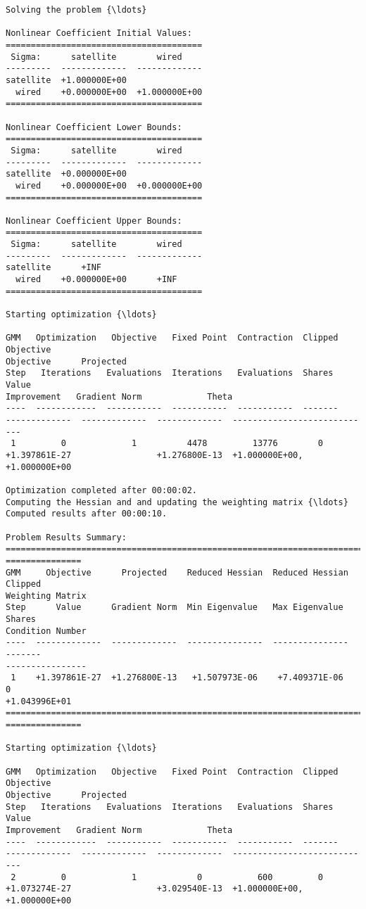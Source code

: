     \begin{Verbatim}[commandchars=\\\{\}]
Solving the problem {\ldots}

Nonlinear Coefficient Initial Values:
=======================================
 Sigma:      satellite        wired
---------  -------------  -------------
satellite  +1.000000E+00
  wired    +0.000000E+00  +1.000000E+00
=======================================

Nonlinear Coefficient Lower Bounds:
=======================================
 Sigma:      satellite        wired
---------  -------------  -------------
satellite  +0.000000E+00
  wired    +0.000000E+00  +0.000000E+00
=======================================

Nonlinear Coefficient Upper Bounds:
=======================================
 Sigma:      satellite        wired
---------  -------------  -------------
satellite      +INF
  wired    +0.000000E+00      +INF
=======================================

Starting optimization {\ldots}

GMM   Optimization   Objective   Fixed Point  Contraction  Clipped    Objective
Objective      Projected
Step   Iterations   Evaluations  Iterations   Evaluations  Shares       Value
Improvement   Gradient Norm             Theta
----  ------------  -----------  -----------  -----------  -------
-------------  -------------  -------------  ----------------------------
 1         0             1          4478         13776        0
+1.397861E-27                 +1.276800E-13  +1.000000E+00, +1.000000E+00

Optimization completed after 00:00:02.
Computing the Hessian and and updating the weighting matrix {\ldots}
Computed results after 00:00:10.

Problem Results Summary:
================================================================================
===============
GMM     Objective      Projected    Reduced Hessian  Reduced Hessian  Clipped
Weighting Matrix
Step      Value      Gradient Norm  Min Eigenvalue   Max Eigenvalue   Shares
Condition Number
----  -------------  -------------  ---------------  ---------------  -------
----------------
 1    +1.397861E-27  +1.276800E-13   +1.507973E-06    +7.409371E-06      0
+1.043996E+01
================================================================================
===============

Starting optimization {\ldots}

GMM   Optimization   Objective   Fixed Point  Contraction  Clipped    Objective
Objective      Projected
Step   Iterations   Evaluations  Iterations   Evaluations  Shares       Value
Improvement   Gradient Norm             Theta
----  ------------  -----------  -----------  -----------  -------
-------------  -------------  -------------  ----------------------------
 2         0             1            0           600         0
+1.073274E-27                 +3.029540E-13  +1.000000E+00, +1.000000E+00


\end{Verbatim}
